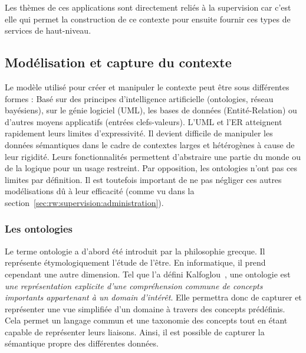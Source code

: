 Les thèmes de ces applications sont directement reliés à la supervision car c'est elle qui permet la construction de ce contexte pour ensuite fournir ces types de services de haut-niveau.

\subsection{Modélisation et capture du contexte}
Le modèle utilisé pour créer et manipuler le contexte peut être sous différentes formes : Basé sur des principes d'intelligence artificielle (ontologies, réseau bayésiens), sur le génie logiciel (UML), les bases de données (Entité-Relation) ou d'autres moyens applicatifs (entrées clefs-valeurs). L'UML et l'ER atteignent rapidement leurs limites d'expressivité. Il devient difficile de manipuler les données sémantiques dans le cadre de contextes larges et hétérogènes à cause de leur rigidité. Leurs fonctionnalités permettent d'abstraire une partie du monde ou de la logique pour un usage restreint. Par opposition, les ontologies n'ont pas ces limites par définition. Il est toutefois important de ne pas négliger ces autres modélisations dû à leur efficacité (comme vu dans la section~\ref{sec:rw:supervision:administration}).

\subsubsection{Les ontologies}
Le terme ontologie a d'abord été introduit par la philosophie grecque. Il représente étymologiquement l'étude de l'être. En informatique, il prend cependant une autre dimension. Tel que l'a défini Kalfoglou~\cite{Kalfoglou:ontology}, une ontologie est \textit{une représentation explicite d'une compréhension commune de concepts importants appartenant à un domain d'intérêt}.
Elle permettra donc de capturer et représenter une vue simplifiée d'un domaine à travers des concepts prédéfinis. Cela permet un langage commun et une taxonomie des concepts tout en étant capable de représenter leurs liaisons. Ainsi, il est possible de capturer la sémantique propre des différentes données.

